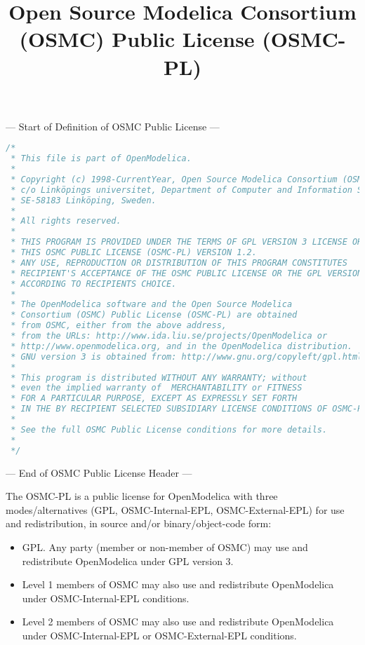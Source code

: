 \documentclass[a4paper, 12pt]{article}
\begin{document}
\title{Open Source Modelica Consortium (OSMC) Public License (OSMC-PL)}
\date{}

\maketitle
--- Start of Definition of OSMC Public License ---

\begin{lstlisting}[language=c++,
	breakatwhitespace=true,
	breaklines=true]
/*
 * This file is part of OpenModelica.
 *
 * Copyright (c) 1998-CurrentYear, Open Source Modelica Consortium (OSMC),
 * c/o Linköpings universitet, Department of Computer and Information Science,
 * SE-58183 Linköping, Sweden.
 *
 * All rights reserved.
 *
 * THIS PROGRAM IS PROVIDED UNDER THE TERMS OF GPL VERSION 3 LICENSE OR
 * THIS OSMC PUBLIC LICENSE (OSMC-PL) VERSION 1.2.
 * ANY USE, REPRODUCTION OR DISTRIBUTION OF THIS PROGRAM CONSTITUTES
 * RECIPIENT'S ACCEPTANCE OF THE OSMC PUBLIC LICENSE OR THE GPL VERSION 3,
 * ACCORDING TO RECIPIENTS CHOICE.
 *
 * The OpenModelica software and the Open Source Modelica
 * Consortium (OSMC) Public License (OSMC-PL) are obtained
 * from OSMC, either from the above address,
 * from the URLs: http://www.ida.liu.se/projects/OpenModelica or
 * http://www.openmodelica.org, and in the OpenModelica distribution.
 * GNU version 3 is obtained from: http://www.gnu.org/copyleft/gpl.html.
 *
 * This program is distributed WITHOUT ANY WARRANTY; without
 * even the implied warranty of  MERCHANTABILITY or FITNESS
 * FOR A PARTICULAR PURPOSE, EXCEPT AS EXPRESSLY SET FORTH
 * IN THE BY RECIPIENT SELECTED SUBSIDIARY LICENSE CONDITIONS OF OSMC-PL.
 *
 * See the full OSMC Public License conditions for more details.
 *
 */
\end{lstlisting}

--- End of OSMC Public License Header ---

\vspace{1cm}

The OSMC-PL is a public license for OpenModelica with three modes/alternatives (GPL, OSMC-Internal-EPL, OSMC-External-EPL) for use and redistribution, in source and/or binary/object-code form:
\begin{itemize}
\item GPL. Any party (member or non-member of OSMC) may use and redistribute
 OpenModelica under GPL version 3.
\item Level 1 members of OSMC may also use and redistribute OpenModelica under
 OSMC-Internal-EPL conditions.
\item Level 2 members of OSMC may also use and redistribute OpenModelica under
 OSMC-Internal-EPL or OSMC-External-EPL conditions.
\end{itemize}
\end{document}

